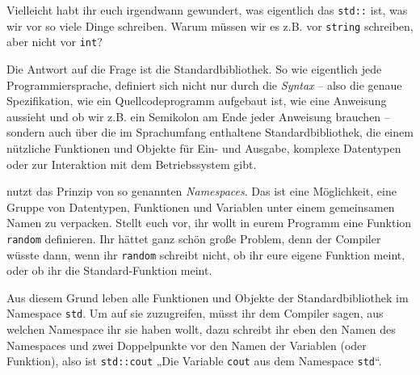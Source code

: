 
Vielleicht habt ihr euch irgendwann gewundert, was eigentlich das
\texttt{std::} ist, was wir vor so viele Dinge schreiben. Warum müssen wir es
z.B. vor \texttt{string} schreiben, aber nicht vor \texttt{int}?

Die Antwort auf die Frage ist die \Cpp Standardbibliothek. So wie eigentlich
jede Programmiersprache, definiert sich \Cpp nicht nur durch die \emph{Syntax}
-- also die genaue Spezifikation, wie ein Quellcodeprogramm aufgebaut ist, wie
eine Anweisung aussieht und ob wir z.B. ein Semikolon am Ende jeder Anweisung
brauchen -- sondern auch über die im Sprachumfang enthaltene
Standardbibliothek, die einem nützliche Funktionen und Objekte für Ein- und
Ausgabe, komplexe Datentypen oder zur Interaktion mit dem Betriebssystem gibt.

\Cpp nutzt das Prinzip von so genannten \emph{Namespaces}. Das ist eine
Möglichkeit, eine Gruppe von Datentypen, Funktionen und Variablen unter einem
gemeinsamen Namen zu verpacken. Stellt euch vor, ihr wollt in eurem Programm
eine Funktion \texttt{random} definieren. Ihr hättet ganz schön große Problem,
denn der Compiler wüsste dann, wenn ihr \texttt{random} schreibt nicht, ob ihr
eure eigene Funktion meint, oder ob ihr die Standard-\Cpp Funktion meint.

Aus diesem Grund leben alle Funktionen und Objekte der \Cpp Standardbibliothek
im Namespace \texttt{std}. Um auf sie zuzugreifen, müsst ihr dem Compiler
sagen, aus welchen Namespace ihr sie haben wollt, dazu schreibt ihr eben den
Namen des Namespaces und zwei Doppelpunkte vor den Namen der Variablen (oder
Funktion), also ist \texttt{std::cout} „Die Variable \texttt{cout} aus dem
Namespace \texttt{std}“.


